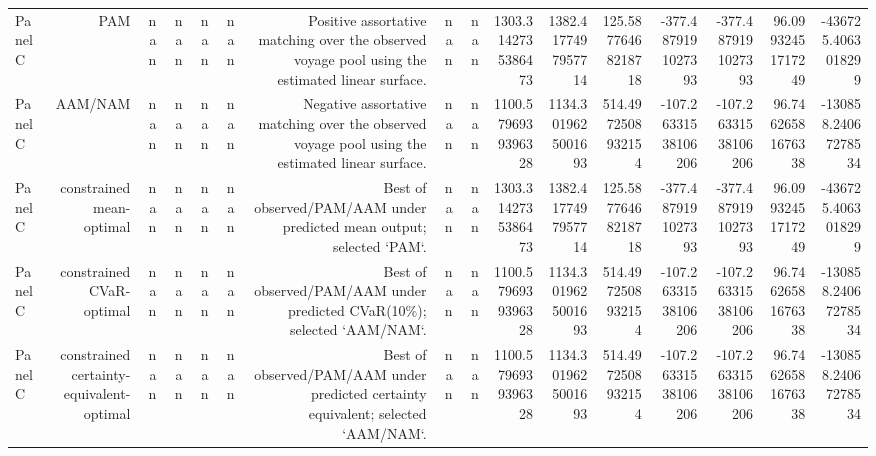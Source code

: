 \documentclass{article}
\begin{document}
\begin{tabular}{lrrrrrrrrrrrrrrr}
Panel C & PAM & nan & nan & nan & nan & Positive assortative matching over the observed voyage pool using the estimated linear surface. & nan & nan & 1303.3142735386473 & 1382.4177497957714 & 125.58776468218718 & -377.4879191027393 & -377.4879191027393 & 96.09932451717249 & -436725.4063018299 \\
Panel C & AAM/NAM & nan & nan & nan & nan & Negative assortative matching over the observed voyage pool using the estimated linear surface. & nan & nan & 1100.5796939396328 & 1134.3019625001693 & 514.4972508932154 & -107.26331538106206 & -107.26331538106206 & 96.74626581676338 & -130858.24067278534 \\
Panel C & constrained mean-optimal & nan & nan & nan & nan & Best of observed/PAM/AAM under predicted mean output; selected `PAM`. & nan & nan & 1303.3142735386473 & 1382.4177497957714 & 125.58776468218718 & -377.4879191027393 & -377.4879191027393 & 96.09932451717249 & -436725.4063018299 \\
Panel C & constrained CVaR-optimal & nan & nan & nan & nan & Best of observed/PAM/AAM under predicted CVaR(10\%); selected `AAM/NAM`. & nan & nan & 1100.5796939396328 & 1134.3019625001693 & 514.4972508932154 & -107.26331538106206 & -107.26331538106206 & 96.74626581676338 & -130858.24067278534 \\
Panel C & constrained certainty-equivalent-optimal & nan & nan & nan & nan & Best of observed/PAM/AAM under predicted certainty equivalent; selected `AAM/NAM`. & nan & nan & 1100.5796939396328 & 1134.3019625001693 & 514.4972508932154 & -107.26331538106206 & -107.26331538106206 & 96.74626581676338 & -130858.24067278534 \\
\hline
\end{tabular}
\end{document}
